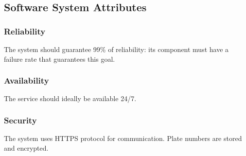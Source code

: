 \subsection{Software System Attributes}

\subsubsection{Reliability}

The system should guarantee 99\% of reliability: its component must have a failure rate that guarantees this goal.

\subsubsection{Availability}

The service should ideally be available 24/7.

\subsubsection{Security}

The system uses HTTPS protocol for communication. Plate numbers are stored and encrypted.